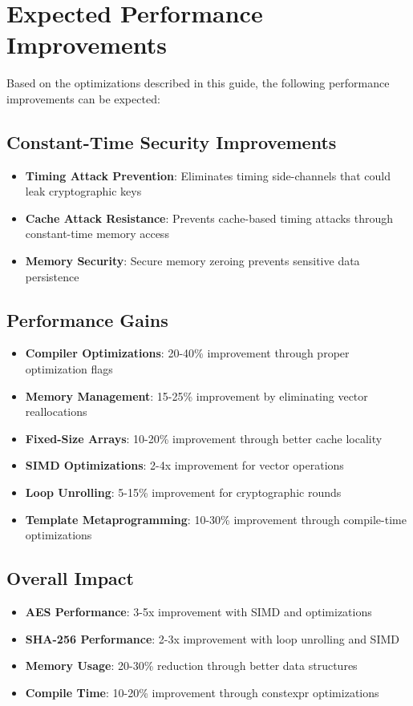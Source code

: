 \documentclass[11pt,a4paper]{article}
\begin{document}
\section{Expected Performance Improvements}

Based on the optimizations described in this guide, the following performance improvements can be expected:

\subsection{Constant-Time Security Improvements}
\begin{itemize}
    \item \textbf{Timing Attack Prevention}: Eliminates timing side-channels that could leak cryptographic keys
    \item \textbf{Cache Attack Resistance}: Prevents cache-based timing attacks through constant-time memory access
    \item \textbf{Memory Security}: Secure memory zeroing prevents sensitive data persistence
\end{itemize}

\subsection{Performance Gains}
\begin{itemize}
    \item \textbf{Compiler Optimizations}: 20-40\% improvement through proper optimization flags
    \item \textbf{Memory Management}: 15-25\% improvement by eliminating vector reallocations
    \item \textbf{Fixed-Size Arrays}: 10-20\% improvement through better cache locality
    \item \textbf{SIMD Optimizations}: 2-4x improvement for vector operations
    \item \textbf{Loop Unrolling}: 5-15\% improvement for cryptographic rounds
    \item \textbf{Template Metaprogramming}: 10-30\% improvement through compile-time optimizations
\end{itemize}

\subsection{Overall Impact}
\begin{itemize}
    \item \textbf{AES Performance}: 3-5x improvement with SIMD and optimizations
    \item \textbf{SHA-256 Performance}: 2-3x improvement with loop unrolling and SIMD
    \item \textbf{Memory Usage}: 20-30\% reduction through better data structures
    \item \textbf{Compile Time}: 10-20\% improvement through constexpr optimizations
\end{itemize}
\end{document}
